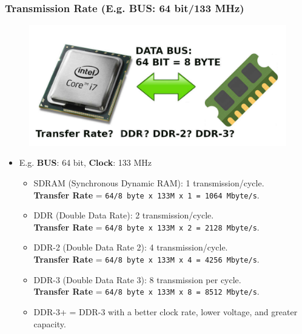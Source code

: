 \documentclass[aspectratio=169, xcolor=table, notheorems, hyperref={pdfpagelabels=false}]{beamer}
\begin{document}
\begin{frame}
\frametitle{Transmission Rate (E.g. \textbf{BUS}: 64 bit/133 MHz)}
\begin{figure}
\includegraphics[width=0.40\linewidth]{os-transfer-rate}
\end{figure}
\begin{itemize}
\item E.g. \textbf{BUS}: 64 bit, \textbf{Clock}: 133 MHz
\begin{itemize}
\item SDRAM (Synchronous Dynamic RAM): 1 transmission/cycle.\\
\textbf{Transfer Rate} = \texttt{64/8 byte x 133M x 1 = 1064 Mbyte/s}.
\item DDR (Double Data Rate): 2 transmission/cycle.\\
\textbf{Transfer Rate} = \texttt{64/8 byte x 133M x 2 = 2128 Mbyte/s}.
\item DDR-2 (Double Data Rate 2): 4 transmission/cycle.\\
\textbf{Transfer Rate} = \texttt{64/8 byte x 133M x 4 = 4256 Mbyte/s}.
\item DDR-3 (Double Data Rate 3): 8 transmission per cycle.\\
\textbf{Transfer Rate} = \texttt{64/8 byte x 133M x 8 = 8512 Mbyte/s}.
\item DDR-3+ = DDR-3 with a better clock rate, lower voltage, and greater capacity.
\end{itemize}
\end{itemize}
\end{frame}
\end{document}
